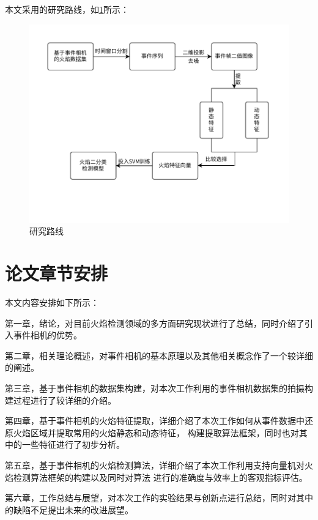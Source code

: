 本文采用的研究路线，如\ref{1}所示：
\begin{figure}
    \centering
    \includegraphics[width=\textwidth]{figures/thesis_flowchart.pdf}
    \caption{研究路线}
    \label{1}
\end{figure}

\section{论文章节安排}

本文内容安排如下所示：

第一章，绪论，对目前火焰检测领域的多方面研究现状进行了总结，同时介绍了引入事件相机的优势。

第二章，相关理论概述，对事件相机的基本原理以及其他相关概念作了一个较详细的阐述。

第三章，基于事件相机的数据集构建，对本次工作利用的事件相机数据集的拍摄构建过程进行了较详细的介绍。

第四章，基于事件相机的火焰特征提取，详细介绍了本次工作如何从事件数据中还原火焰区域并提取常用的火焰静态和动态特征，
构建提取算法框架，同时也对其中的一些特征进行了初步分析。

第五章，基于事件相机的火焰检测算法，详细介绍了本次工作利用支持向量机对火焰检测算法框架的构建以及同时对算法
进行的准确度与效率上的客观指标评估。

第六章，工作总结与展望，对本次工作的实验结果与创新点进行总结，同时对其中的缺陷不足提出未来的改进展望。

